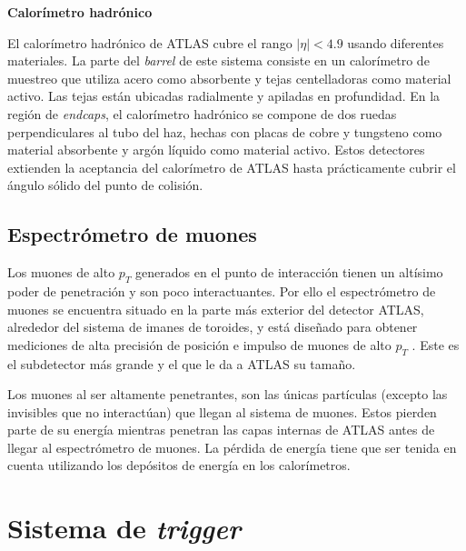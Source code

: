 {\bf Calorímetro hadrónico }

El calorímetro hadrónico de ATLAS cubre el rango $|\eta|< 4.9$ usando diferentes materiales. La parte del \textit{barrel} de este sistema consiste en un calorímetro de muestreo que utiliza acero como absorbente y tejas centelladoras como material activo. Las tejas están ubicadas radialmente y apiladas en profundidad. En la región de \textit{endcaps}, el calorímetro hadrónico se compone de dos ruedas perpendiculares al tubo del haz, hechas con placas de cobre y tungsteno como material absorbente y argón líquido como material activo. Estos detectores extienden la aceptancia del calorímetro de ATLAS hasta prácticamente cubrir el ángulo sólido del punto de colisión.

\subsection{Espectrómetro de muones}

Los muones de alto $p_{T}$ generados en el punto de interacción tienen un altísimo poder de penetración y son poco interactuantes. Por ello el espectrómetro de muones se encuentra situado en la parte más exterior del detector ATLAS, alrededor del sistema de imanes de toroides, y está diseñado para obtener mediciones de alta precisión de posición e impulso de muones de alto $p_{T}$ . Este es el subdetector más grande y el que le da a ATLAS su tamaño. 

Los muones al ser altamente penetrantes, son las únicas partículas (excepto las invisibles que no interactúan) que llegan al sistema de muones. Estos pierden parte de su energía mientras penetran las capas internas de ATLAS antes de llegar al espectrómetro de muones. La pérdida de energía tiene que ser tenida en cuenta utilizando los depósitos de energía en los calorímetros.

\section{Sistema de \textit{trigger}}
